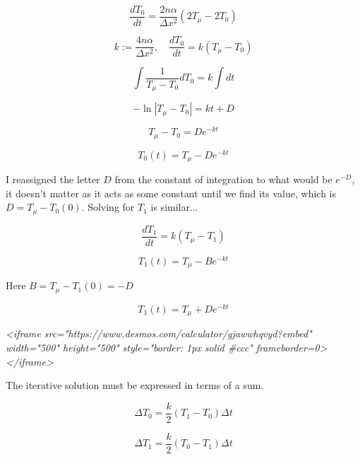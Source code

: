 \documentclass{article}
\begin{document}
\begin{equation*}
    \frac{dT_0}{dt} =  \frac{2n\alpha}{\Delta x^2}(2T_\mu-2T_0)
\end{equation*}

\begin{equation}
    k := \frac{4n\alpha}{\Delta x^2},\quad \frac{dT_0}{dt} =  k(T_\mu-T_0)
\end{equation}

\begin{equation*}
    \int \frac{1}{T_\mu-T_0}dT_0 =  k\int dt
\end{equation*}

\begin{equation*}
    -\ln|T_\mu-T_0| =  kt+D
\end{equation*}

\begin{equation*}
    T_\mu-T_0 =  De^{-kt}
\end{equation*}

\begin{equation}
    T_0(t) =  T_\mu-De^{-kt}
\end{equation}

I reassigned the letter $D$ from the constant of integration to what would be $e^{-D}$, it doesn't matter as it acts as some constant until we find its value, which is $D=T_\mu-T_0(0)$. Solving for $T_1$ is similar...

\begin{equation}
    \frac{dT_1}{dt} =  k(T_\mu-T_1)
\end{equation}

\begin{equation*}
    T_1(t) =  T_\mu-Be^{-kt}
\end{equation*}

Here $B=T_\mu-T_1(0)=-D$

\begin{equation}
    T_1(t) =  T_\mu+De^{-kt}
\end{equation}

\emph{<iframe src="https://www.desmos.com/calculator/gjawwhqvyd?embed" width="500" height="500" style="border: 1px solid #ccc" frameborder=0></iframe>}

The iterative solution must be expressed in terms of a sum.

\begin{equation}
    \Delta T_0 = \frac{k}{2}(T_1-T_0)\Delta t
\end{equation}

\begin{equation}
    \Delta T_1 = \frac{k}{2}(T_0-T_1)\Delta t
\end{equation}
\end{document}
